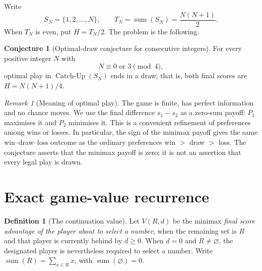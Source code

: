 \documentclass[11pt,a4paper]{article}
\theoremstyle{definition}
\newtheorem{definition}[theorem]{Definition}
\newtheorem{conjecture}[theorem]{Conjecture}
\theoremstyle{remark}
\newtheorem{remark}[theorem]{Remark}
\newcommand{\SN}{S_N}
\newcommand{\TN}{T_N}
\newcommand{\sm}{\operatorname{sum}}
\begin{document}
Write
\[
\SN=\{1,2,\ldots,N\},\qquad
\TN=\sm(\SN)=\frac{N(N+1)}2.
\]
When $\TN$ is even, put $H=\TN/2$.  The problem is the following.

\begin{conjecture}[Optimal-draw conjecture for consecutive integers]
\label{conj:main}
For every positive integer $N$ with
\[
N\equiv 0\text{ or }3\pmod 4,
\]
optimal play in $\operatorname{Catch\mbox{-}Up}(\SN)$ ends in a draw;
that is, both final scores are $H=N(N+1)/4$.
\end{conjecture}

\begin{remark}[Meaning of optimal play]
The game is finite, has perfect information and no chance moves.
We use the final difference $s_1-s_2$ as a zero-sum payoff: $P_1$
maximises it and $P_2$ minimises it.  This is a convenient refinement
of preferences among wins or losses.  In particular, the sign of the
minimax payoff gives the same win--draw--loss outcome as the ordinary
preferences win $>$ draw $>$ loss.  The conjecture asserts that the
minimax payoff is zero; it is not an assertion that every legal play
is drawn.
\end{remark}

\section{Exact game-value recurrence}

\begin{definition}[The continuation value]
Let $V(R,d)$ be the minimax \emph{final score advantage of the player
about to select a number}, when the remaining set is $R$ and that
player is currently behind by $d\ge0$.  When $d=0$ and $R\ne\varnothing$,
the designated player is nevertheless required to select a number.
Write $\sm(R)=\sum_{x\in R}x$, with $\sm(\varnothing)=0$.
\end{definition}
\end{document}
